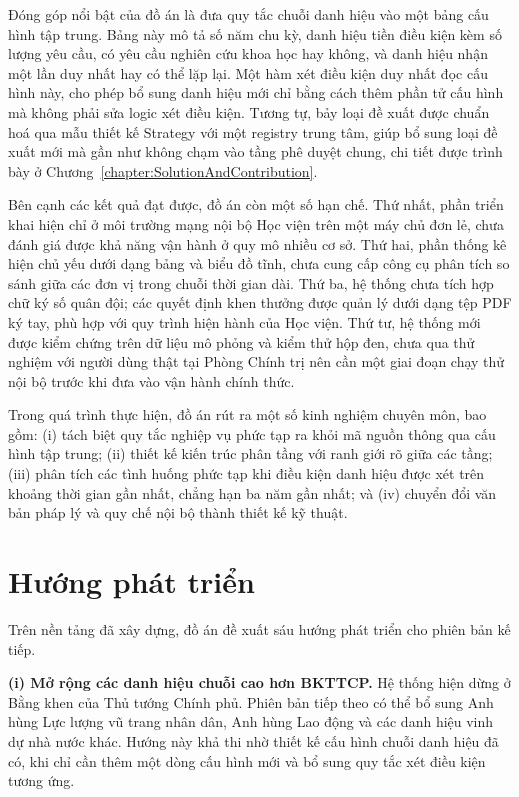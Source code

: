 \documentclass[../DoAn.tex]{subfiles}
\begin{document}
Đóng góp nổi bật của đồ án là đưa quy tắc chuỗi danh hiệu vào một bảng cấu hình tập trung.
Bảng này mô tả số năm chu kỳ, danh hiệu tiền điều kiện kèm số lượng yêu cầu, có yêu cầu nghiên cứu khoa học hay không, và danh hiệu nhận một lần duy nhất hay có thể lặp lại.
Một hàm xét điều kiện duy nhất đọc cấu hình này, cho phép bổ sung danh hiệu mới chỉ bằng cách thêm phần tử cấu hình mà không phải sửa logic xét điều kiện.
Tương tự, bảy loại đề xuất được chuẩn hoá qua mẫu thiết kế Strategy với một registry trung tâm, giúp bổ sung loại đề xuất mới mà gần như không chạm vào tầng phê duyệt chung, chi tiết được trình bày ở Chương~\ref{chapter:SolutionAndContribution}.

Bên cạnh các kết quả đạt được, đồ án còn một số hạn chế.
Thứ nhất, phần triển khai hiện chỉ ở môi trường mạng nội bộ Học viện trên một máy chủ đơn lẻ, chưa đánh giá được khả năng vận hành ở quy mô nhiều cơ sở.
Thứ hai, phần thống kê hiện chủ yếu dưới dạng bảng và biểu đồ tĩnh, chưa cung cấp công cụ phân tích so sánh giữa các đơn vị trong chuỗi thời gian dài.
Thứ ba, hệ thống chưa tích hợp chữ ký số quân đội; các quyết định khen thưởng được quản lý dưới dạng tệp PDF ký tay, phù hợp với quy trình hiện hành của Học viện.
Thứ tư, hệ thống mới được kiểm chứng trên dữ liệu mô phỏng và kiểm thử hộp đen, chưa qua thử nghiệm với người dùng thật tại Phòng Chính trị nên cần một giai đoạn chạy thử nội bộ trước khi đưa vào vận hành chính thức.

Trong quá trình thực hiện, đồ án rút ra một số kinh nghiệm chuyên môn, bao gồm: (i) tách biệt quy tắc nghiệp vụ phức tạp ra khỏi mã nguồn thông qua cấu hình tập trung; (ii) thiết kế kiến trúc phân tầng với ranh giới rõ giữa các tầng; (iii) phân tích các tình huống phức tạp khi điều kiện danh hiệu được xét trên khoảng thời gian gần nhất, chẳng hạn ba năm gần nhất; và (iv) chuyển đổi văn bản pháp lý và quy chế nội bộ thành thiết kế kỹ thuật.

\section{Hướng phát triển}
\label{section:6.2}

Trên nền tảng đã xây dựng, đồ án đề xuất sáu hướng phát triển cho phiên bản kế tiếp.

\textbf{(i) Mở rộng các danh hiệu chuỗi cao hơn BKTTCP.} Hệ thống hiện dừng ở Bằng khen của Thủ tướng Chính phủ.
Phiên bản tiếp theo có thể bổ sung Anh hùng Lực lượng vũ trang nhân dân, Anh hùng Lao động và các danh hiệu vinh dự nhà nước khác.
Hướng này khả thi nhờ thiết kế cấu hình chuỗi danh hiệu đã có, khi chỉ cần thêm một dòng cấu hình mới và bổ sung quy tắc xét điều kiện tương ứng.
\end{document}
